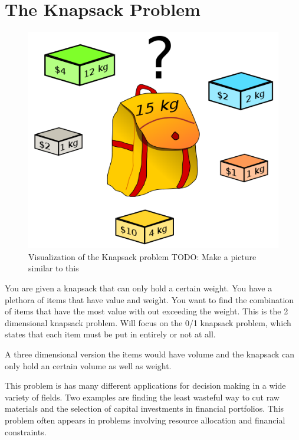 \label{lab:Knapsack}


\section*{The Knapsack Problem}

\begin{figure}
\includegraphics[width=\textwidth]{Knapsack.png}
\caption{Visualization of the Knapsack problem TODO: Make a picture similar to this}
\end{figure}

You are given a knapsack that can only hold a certain weight.
You have a plethora of items that have value and weight.
You want to find the combination of items that have the most value with out exceeding the weight.
This is the 2 dimensional knapsack problem.
Will focus on the 0/1 knapsack problem, which states that each item must be put in entirely or not at all.

A three dimensional version the items would have volume and the knapsack can only hold an certain volume as well as weight. 

This problem is has many different applications for decision making in a wide variety of fields.
Two examples are finding the least wasteful way to cut raw materials and the selection of capital investments in financial portfolios.
This problem often appears in problems involving resource allocation and financial constraints.

